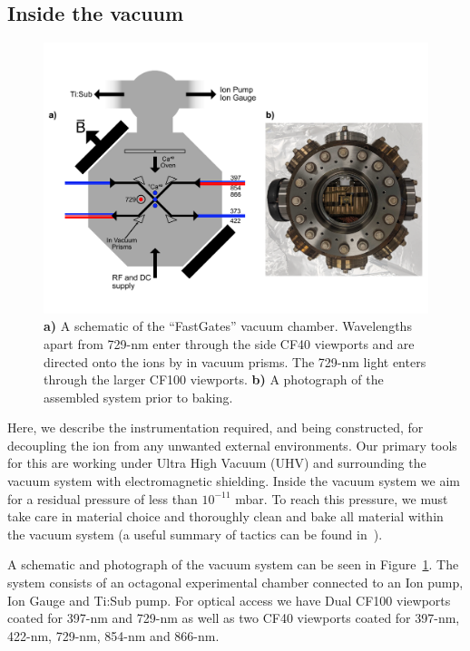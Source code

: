 \documentclass[12pt]{iopart}
\begin{document}
\subsection{Inside the vacuum}

\begin{figure}
  \begin{center}
   \noindent\includegraphics[width=\linewidth]{figures/vacuum_can.pdf}
  \end{center}
  \caption{
    \textbf{a)} A schematic of the ``FastGates'' vacuum
    chamber. Wavelengths apart from 729-nm enter through the side CF40
    viewports and are directed onto the ions by in vacuum prisms. The
    729-nm light enters through the larger CF100 viewports.
    \textbf{b)} A photograph of the assembled system prior to baking.
  }
  \label{fig:can}
\end{figure}

Here, we describe the instrumentation required, and being constructed,
for decoupling the ion from any unwanted external environments. Our
primary tools for this are working under Ultra High Vacuum (UHV) and
surrounding the vacuum system with electromagnetic shielding. Inside
the vacuum system we aim for a residual pressure of less than
$10^{-11}$ mbar. To reach this pressure, we must take care in material
choice and thoroughly clean and bake all material within the vacuum
system (a useful summary of tactics can be found in~\cite{birnbaum_ultra-high_2005, wolf_cryogenic_2019}).

A schematic and photograph of the vacuum system can be seen in
Figure~\ref{fig:can}. The system consists of an octagonal experimental
chamber connected to an Ion pump, Ion Gauge and Ti:Sub pump. For
optical access we have Dual CF100 viewports coated for 397-nm and
729-nm as well as two CF40 viewports coated for 397-nm, 422-nm,
729-nm, 854-nm and 866-nm.
\end{document}
